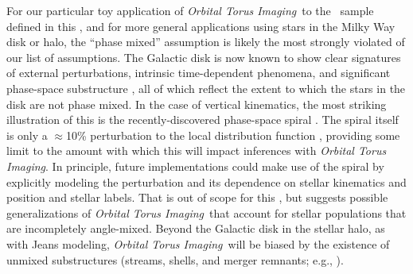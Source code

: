\documentclass[modern]{aastex63}
\newcommand{\methodname}{\textsl{Orbital Torus Imaging}}
\newcommand{\apogee}{\acronym{APOGEE}}
\begin{document}
For our particular toy application of \methodname\ to the \apogee\ sample
defined in this \documentname, and for more general applications using stars in
the Milky Way disk or halo, the ``phase mixed'' assumption is likely the most
strongly violated of our list of assumptions.
The Galactic disk is now known to show clear signatures of external
perturbations, intrinsic time-dependent phenomena, and significant phase-space
substructure \citep[e.g.,][]{Antoja:2018, Schonrich:2018, Hunt:2018,
Kamdar:2019, Monari:2019, Khanna:2019, Poggio:2020, Laporte:2020}, all of which
reflect the extent to which the stars in the disk are not phase mixed.
In the case of vertical kinematics, the most striking illustration of this is
the recently-discovered phase-space spiral \citep{Antoja:2018}.
The spiral itself is only a $\approx$10\% perturbation to the local distribution
function \citep{Laporte:2019}, providing some limit to the amount with which
this will impact inferences with \methodname.
In principle, future implementations could make use of the spiral by explicitly
modeling the perturbation and its dependence on stellar kinematics and position
and stellar labels.
That is out of scope for this \documentname, but suggests possible
generalizations of \methodname\ that account for stellar populations that are
incompletely angle-mixed.
Beyond the Galactic disk in the stellar halo, as with Jeans modeling,
\methodname\ will be biased by the existence of unmixed substructures (streams,
shells, and merger remnants; e.g., \citealt{TODO}).

\end{document}
